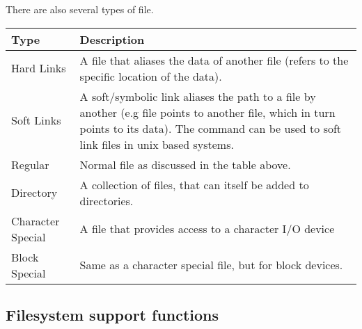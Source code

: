 \documentclass{report}
\begin{document}
There are also several types of file.
\begin{center}
	\begin{tabular}{l p{14cm}}
		\textbf{Type}     & \textbf{Description}                                            \\
		\hline
		Hard Links        & A file that aliases the data of another file (refers
		to the specific location of the data).                                              \\
		Soft Links        & A soft/symbolic link aliases the path to a file
		by another (e.g file points to another file, which
		in turn points to its data). The \fun{ln} command can
		be used to soft link files in unix based systems.                                   \\
		Regular           & Normal file as discussed in the table above.                    \\
		Directory         & A collection of files, that can itself be added to directories. \\
		Character Special & A file that provides access to a character I/O device
		\\
		Block Special     & Same as a character special file, but for block devices.        \\
	\end{tabular}
\end{center}

\subsection*{Filesystem support functions}
\end{document}
